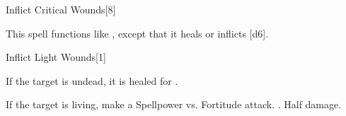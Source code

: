 \begin{spellsection}[Mass]{Inflict Critical Wounds}[8]
    \begin{spellheader}
    \end{spellheader}
    \begin{spellcontent}
        \begin{spelltargetinginfo}
        \end{spelltargetinginfo}
        \begin{spelleffects}
            \spellspecial This spell functions like , except that it heals or inflicts [d6].
        \end{spelleffects}
    \end{spellcontent}
    \begin{spellfooter}
        \miscastexplode
    \end{spellfooter}
\end{spellsection}

\begin{spellsection}{Inflict Light Wounds}[1]
    \begin{spellheader}
    \end{spellheader}
    \begin{spellcontent}
        \begin{spelltargetinginfo}
        \end{spelltargetinginfo}
        \begin{spelleffects}
            \spelleffect If the target is undead, it is healed for .
            \begin{spellattacktriggered}{If the target is living, make a Spellpower vs. Fortitude attack.}
                \spellsuccess {}.
                \spellfailure Half damage.
            \end{spellattacktriggered}
        \end{spelleffects}
    \end{spellcontent}
    \begin{spellfooter}
        \miscastrandom
    \end{spellfooter}
\end{spellsection}

